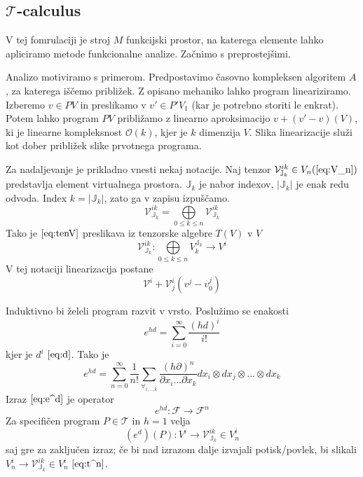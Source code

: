 \documentclass{article}
\newcommand{\JJ}{\mathbb{J}}
\newcommand{\T}{\mathcal{T}}
\newcommand{\VV}{\mathcal{V}}
\newcommand{\F}{\mathcal{F}}
\begin{document}
 \subsection{$\T$-calculus}
 
 V tej fomrulaciji je stroj $M$ funkcijski prostor,  na katerega elemente lahko apliciramo metode funkcionalne analize. Začnimo s preprostejšimi.
 
 Analizo motiviramo s primerom. Predpostavimo časovno kompleksen algoritem $A$, za katerega iščemo približek. Z opisano mehaniko lahko program lineariziramo.
 Izberemo $v\in PV$ in preslikamo v $v'\in P'V_1$ (kar je potrebno storiti le enkrat). Potem lahko program $PV$ približamo z linearno aproksimacijo $v+(v'-v) (V)$, ki je linearne kompleksnost $\mathcal{O}(k)$, kjer je $k$ dimenzija $V$.
 Slika linearizacije služi kot dober približek slike prvotnega programa.
 
 
 Za nadaljevanje je prikladno vnesti nekaj notacije. Naj tenzor $\VV^{ik}_{\JJ_k}\in V_n (\ref{eq:V_n})$ predstavlja element virtualnega prostora. $\JJ_k$ je nabor indexov, $\lvert\JJ_k\rvert$ je enak redu odvoda. Index $k=\lvert\JJ_k\rvert$, zato ga v zapisu izpuščamo. 
 \begin{equation}\label{eq:tenV}
 	\VV^{ik}_{\JJ_k}= \bigoplus\limits_{0\le k\le n} \VV^{ik}_{\JJ_k}
 \end{equation}
 Tako je $\eqref{eq:tenV}$ preslikava iz tenzorske algebre $T(V)$ v $V$
 \begin{equation}\label{eq:vto}
 	\VV^{ik}_{\JJ_k}:\bigoplus\limits_{0\le k\le n}V^{\JJ_k}_{k}\to V^i
 \end{equation}
 V tej notaciji linearizacija postane
 \begin{equation}\label{eq:linear}
	\VV^i+\VV^i_j(v^j-v_0^j)
 \end{equation}
 
 Induktivno bi želeli program razvit v vrsto. Poslužimo se enakosti
\begin{equation}
	e^{hd}=\sum\limits_{i=0}^{\infty}\frac{(hd)^i}{i!}
\end{equation}
kjer je $d^i$ $\eqref{eq:d}$. Tako je
\begin{equation}\label{eq:e^d}
	e^{hd}=\sum\limits_{n=0}^{\infty}\frac{1}{n!}\sum_{\forall_{i,..,k}}\frac{(h\partial)^n }{\partial x_i...\partial x_k}dx_i\otimes dx_j\otimes...\otimes dx_k
\end{equation}
Izraz $\eqref{eq:e^d}$ je operator
\begin{equation}
	e^{hd}:\F\to\F^n
\end{equation}
Za specifičen program $P\in\T$ in $h=1$ velja
\begin{equation}\label{eq:specProg}
	(e^{d})(P):V^i\to \VV^{ik}_{\JJ_k}\in V_n^i
\end{equation}
saj gre za zaključen izraz; če bi nad izrazom dalje izvajali potisk/povlek, bi slikali $V^i_n\to\VV^{ik}_{\JJ_k}\in V^i_n$ $\eqref{eq:t^n}$.
\end{document}
